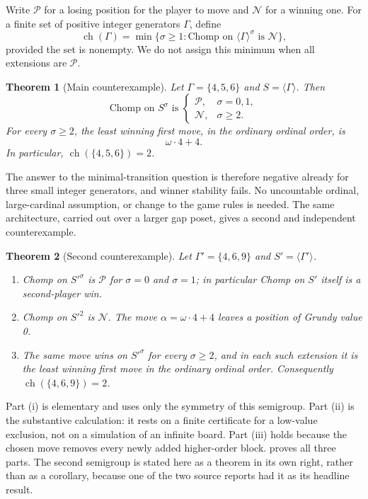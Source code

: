 \documentclass[11pt,letterpaper]{article}
\numberwithin{equation}{section}
\newtheorem{theorem}{Theorem}[section]
\theoremstyle{definition}
\theoremstyle{remark}
\newcommand{\Pout}{\mathcal P}
\newcommand{\Nout}{\mathcal N}
\newcommand{\ch}{\operatorname{ch}}
\begin{document}
Write $\Pout$ for a losing position for the player to move and $\Nout$
for a winning one. For a finite set of positive integer generators
$\Gamma$, define
\[
 \ch(\Gamma)=\min\{\sigma\geq1:\text{Chomp on }
 \langle\Gamma\rangle^\sigma\text{ is }\Nout\},
\]
provided the set is nonempty. We do not assign this minimum when all
extensions are $\Pout$.

\begin{theorem}[Main counterexample]\label{thm:main}
Let $\Gamma=\{4,5,6\}$ and $S=\langle\Gamma\rangle$. Then
\[
 \text{Chomp on }S^\sigma\text{ is }
 \begin{cases}
   \Pout,&\sigma=0,1,\\
   \Nout,&\sigma\geq2.
 \end{cases}
\]
For every $\sigma\geq2$, the least winning first move, in the ordinary
ordinal order, is
\begin{equation}\label{eq:opening}
 \boxed{\omega\cdot4+4.}
\end{equation}
In particular, $\ch(\{4,5,6\})=2$.
\end{theorem}

The answer to the minimal-transition question is therefore negative
already for three small integer generators, and winner stability fails.
No uncountable ordinal, large-cardinal assumption, or change to the game
rules is needed. The same architecture, carried out over a larger gap
poset, gives a second and independent counterexample.

\begin{theorem}[Second counterexample]\label{thm:second}
Let $\Gamma'=\{4,6,9\}$ and $S'=\langle\Gamma'\rangle$.
\begin{enumerate}[label=\textup{(\roman*)},leftmargin=2.2em]
\item Chomp on $S'^{\sigma}$ is $\Pout$ for $\sigma=0$ and $\sigma=1$;
      in particular Chomp on $S'$ itself is a second-player win.
\item Chomp on $S'^{2}$ is $\Nout$. The move $\alpha=\omega\cdot4+4$
      leaves a position of Grundy value 0.
\item The same move wins on $S'^{\sigma}$ for every $\sigma\geq2$, and in
      each such extension it is the least winning first move in the
      ordinary ordinal order. Consequently $\ch(\{4,6,9\})=2$.
\end{enumerate}
\end{theorem}

Part (i) is elementary and uses only the symmetry of this semigroup.
Part (ii) is the substantive calculation: it rests on a finite certificate
for a low-value exclusion, not on a simulation of an infinite board.
Part (iii) holds because the chosen move removes every newly added
higher-order block.  proves all three parts. The second
semigroup is stated here as a theorem in its own right, rather than as a
corollary, because one of the two source reports had it as its headline
result.
\end{document}
